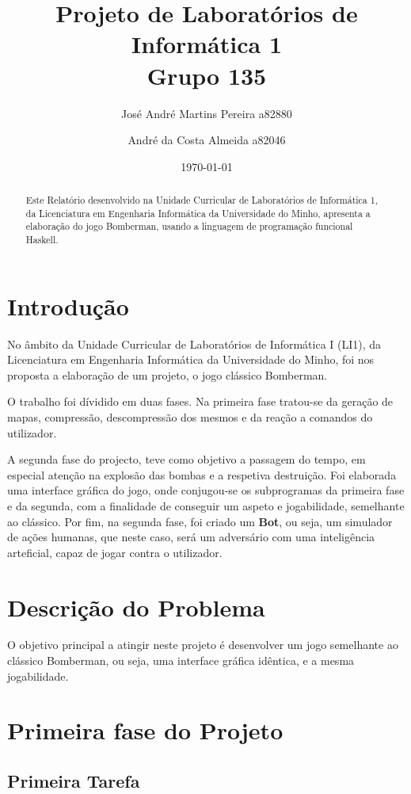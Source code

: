 \documentclass[4apaper]{report}
\title{Projeto de Laboratórios de Informática 1\\Grupo 135}
\author{José André Martins Pereira a82880 \and André da Costa Almeida a82046}
\date{\today}
\begin{document}
\maketitle
\begin{abstract}
Este Relatório desenvolvido na Unidade Curricular de Laboratórios de Informática 1, da Licenciatura em Engenharia Informática da Universidade do Minho, apresenta a elaboração do jogo Bomberman, usando a linguagem de programação funcional Haskell.
\end{abstract}
\tableofcontents

\section{Introdução}
\label{sec:intro}

No âmbito da Unidade Curricular de Laboratórios de Informática I (LI1), da Licenciatura em Engenharia Informática da Universidade do Minho, foi nos proposta a elaboração de um projeto, o jogo clássico Bomberman. 

O trabalho foi dívidido em duas fases. Na primeira fase tratou-se da geração de mapas, compressão, descompressão dos mesmos e da reação a comandos do utilizador. 

A segunda fase do projecto, teve como objetivo a passagem do tempo, em especial atenção na explosão das bombas e a respetiva destruição. Foi elaborada uma interface gráfica do jogo, onde conjugou-se os subprogramas da primeira fase e da segunda, com a finalidade de conseguir um aspeto e jogabilidade, semelhante ao clássico. Por fim, na segunda fase, foi criado um \textbf{Bot}, ou seja, um simulador de ações humanas, que neste caso, será um adversário com uma inteligência arteficial, capaz de jogar contra o utilizador.

\section{Descrição do Problema}
\label{sec:approjecto}

O objetivo principal a atingir neste projeto é desenvolver um jogo semelhante ao clássico Bomberman, ou seja, uma interface gráfica idêntica, e a mesma jogabilidade.

\section{Primeira fase do Projeto}
\label{sec:primeirafase}

\subsection{Primeira Tarefa}
\end{document}
